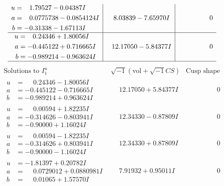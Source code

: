 \documentclass[1p]{elsarticle_modified}
\theoremstyle{definition}
\newcommand{\I}{\sqrt{-1}}
\begin{document}
$$\begin{array}{c|c|c}
\begin{aligned}
u &= \phantom{-}1.79527 - 0.04387 I \\
a &= \phantom{-}0.0775738 - 0.0854124 I \\
b &= -0.31338 - 1.67113 I\end{aligned}
 & \phantom{-}8.03839 - 7.65970 I & \phantom{-0.000000 } 0 \\ \hline\begin{aligned}
u &= \phantom{-}0.24346 + 1.80056 I \\
a &= -0.445122 + 0.716665 I \\
b &= -0.989214 - 0.963624 I\end{aligned}
 & \phantom{-}12.17050 - 5.84377 I & \phantom{-0.000000 } 0\\
 \hline 
 \end{array}$$\newpage$$\begin{array}{c|c|c}  
\text{Solutions to }I^u_{1}& \I (\text{vol} + \sqrt{-1}CS) & \text{Cusp shape}\\
 \hline 
\begin{aligned}
u &= \phantom{-}0.24346 - 1.80056 I \\
a &= -0.445122 - 0.716665 I \\
b &= -0.989214 + 0.963624 I\end{aligned}
 & \phantom{-}12.17050 + 5.84377 I & \phantom{-0.000000 } 0 \\ \hline\begin{aligned}
u &= \phantom{-}0.00594 + 1.82235 I \\
a &= -0.314626 - 0.803941 I \\
b &= -0.90000 + 1.16024 I\end{aligned}
 & \phantom{-}12.34330 - 0.87809 I & \phantom{-0.000000 } 0 \\ \hline\begin{aligned}
u &= \phantom{-}0.00594 - 1.82235 I \\
a &= -0.314626 + 0.803941 I \\
b &= -0.90000 - 1.16024 I\end{aligned}
 & \phantom{-}12.34330 + 0.87809 I & \phantom{-0.000000 } 0 \\ \hline\begin{aligned}
u &= -1.81397 + 0.20782 I \\
a &= \phantom{-}0.0729012 + 0.0880981 I \\
b &= \phantom{-}0.01065 + 1.57570 I\end{aligned}
 & \phantom{-}7.91932 + 0.95011 I & \phantom{-0.000000 } 0 \\ \hline\begin{aligned}

\end{aligned}
\end{array}$$
\end{document}

